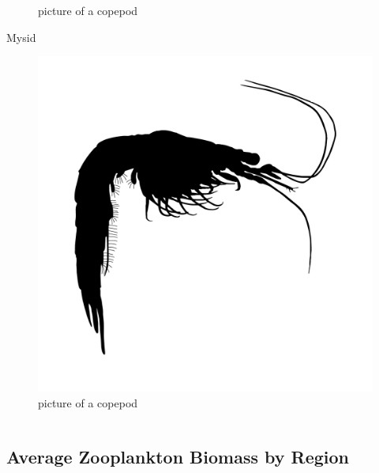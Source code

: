 \documentclass[
]{book}
\begin{document}
\begin{columns-nocenter}
\begin{column}
\begin{figure}
{}

\caption{picture of a copepod}\label{fig:unnamed-chunk-67}
\end{figure}

Mysid

\begin{figure}

{\centering \includegraphics[width=16.67in]{figures/mysid} 

}

\caption{picture of a copepod}\label{fig:unnamed-chunk-68}
\end{figure}

\end{column}

\end{columns-nocenter}

\hypertarget{average-zooplankton-biomass-by-region}{%
\subsection{Average Zooplankton Biomass by Region}\label{average-zooplankton-biomass-by-region}}
\end{document}
